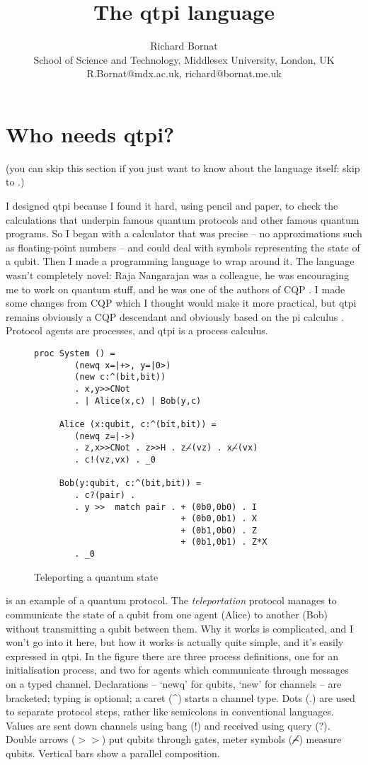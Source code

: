 \documentclass[11pt,a4paper]{article}
\title{The qtpi language}
\author{Richard Bornat \\ School of Science and Technology, Middlesex University, London, UK \\ R.Bornat@mdx.ac.uk, richard@bornat.me.uk}
\begin{document}
\newpage
\tableofcontents
\newpage
\section{Who needs qtpi?}

(you can skip this section if you just want to know about the language itself: skip to .)

I designed qtpi because I found it hard, using pencil and paper, to check the calculations that underpin famous quantum protocols and other famous quantum programs. So I began with a calculator that was precise -- no approximations such as floating-point numbers -- and could deal with symbols representing the state of a qubit. Then I made a programming language to wrap around it. The language wasn't completely novel: Raja Nangarajan was a colleague, he was encouraging me to work on quantum stuff, and he was one of the authors of CQP \citep{GaySJ:comqp}. I made some changes from CQP which I thought would make it more practical, but qtpi remains obviously a CQP descendant and obviously based on the pi calculus \citep{DBLP:journals/iandc/MilnerPW92a}. Protocol agents are processes, and qtpi is a process calculus. 

\begin{figure}
\centering
\begin{verbatim}
proc System () = 
        (newq x=|+>, y=|0>)  
        (new c:^(bit,bit))
        . x,y>>CNot 
        . | Alice(x,c) | Bob(y,c)

     Alice (x:qubit, c:^(bit,bit)) = 
        (newq z=|->) 
        . z,x>>CNot . z>>H . z⌢̸(vz) . x⌢̸(vx)
        . c!(vz,vx) . _0 

     Bob(y:qubit, c:^(bit,bit)) = 
        . c?(pair) . 
        . y >>  match pair . + (0b0,0b0) . I
                             + (0b0,0b1) . X
                             + (0b1,0b0) . Z
                             + (0b1,0b1) . Z*X 
        . _0
\end{verbatim}
\caption{Teleporting a quantum state}
\end{figure}

 is an example of a quantum protocol. The \emph{teleportation} protocol \citep{bbcjp:93}\citep{teleportwiki} manages to communicate the state of a qubit from one agent (Alice) to another (Bob) without transmitting a qubit between them. Why it works is complicated, and I won't go into it here, but how it works is actually quite simple, and it's easily expressed in qtpi. In the figure there are three process definitions, one for an initialisation process, and two for agents which communicate through messages on a typed channel. Declarations -- `newq' for qubits, `new' for channels -- are bracketed; typing is optional; a caret (\^{}) starts a channel type. Dots (.) are used to separate protocol steps, rather like semicolons in conventional languages. Values are sent down channels using bang (!) and received using query (?). Double arrows ($>\!>$) put qubits through gates, meter symbols (⌢̸) measure qubits. Vertical bars show a parallel composition. 
\end{document}
